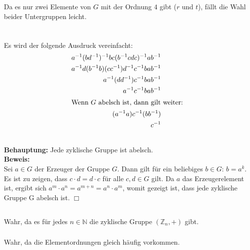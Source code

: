 \documentclass[10pt,a4paper,oneside,ngerman,numbers=noenddot]{scrartcl}
\begin{document}
\subsection{} %
Da es nur zwei Elemente von $G$ mit der Ordnung $4$ gibt ($r$ und $t$), fällt die Wahl beider Untergruppen leicht.
\section{} %
\subsection{} %
Es wird der folgende Ausdruck vereinfacht:
\begin{alignat*}{2}
a^{-1}(bd^{-1})^{-1}bc(b^{-1}cdc)^{-1}ab^{-1} \\
a^{-1}d(b^{-1}b)(cc^{-1})d^{-1}c^{-1}bab^{-1} \\
a^{-1}(dd^{-1})c^{-1}bab^{-1} \\
a^{-1}c^{-1}bab^{-1} \\
\intertext{Wenn $G$ abelsch ist, dann gilt weiter:}
(a^{-1}a)c^{-1}(bb^{-1}) \\
c^{-1}
\end{alignat*}
\subsection{} %
\textbf{Behauptung:} Jede zyklische Gruppe ist abelsch.\\
\textbf{Beweis:}\\
Sei $a \in G$ der Erzeuger der Gruppe $G$. Dann gilt für ein beliebiges $b \in G$: $b=a^{k}$.
Es ist zu zeigen, dass $c \cdot d = d \cdot c$ für alle $c,d \in G$ gilt. Da $a$ das Erzeugerelement ist, ergibt sich $a^{m} \cdot a^{n} = a^{m+n} = a^{n} \cdot a^{m}$, womit gezeigt ist, dass jede zyklische Gruppe G abelsch ist. \hfill $\Box$
\subsection{} %

\subsubsection{} %
Wahr, da es für jedes $n \in \mathbb{N}$ die zyklische Gruppe $(\mathbb{Z}_{n},+)$ gibt.
\subsubsection{} %
Wahr, da die Elementordnungen gleich häufig vorkommen.
\end{document}

